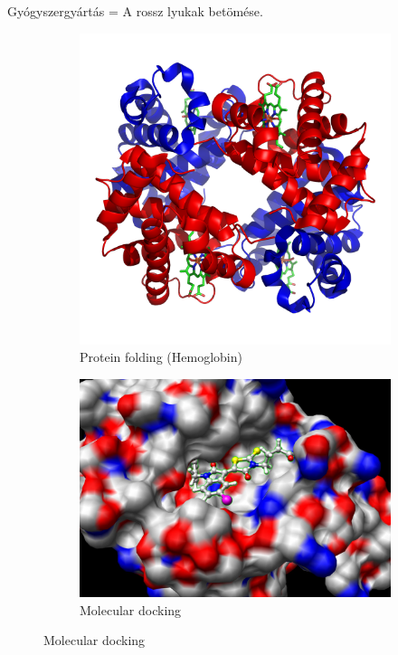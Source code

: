 \documentclass[aspectratio=169]{beamer}
\begin{document}
\begin{frame}{Gyógyszergyártás = A rossz lyukak betömése.}


\begin{figure}[H]
  \centering
  \begin{subfigure}{.4\linewidth}
    \centering
    \includegraphics[width=\linewidth]{./dipterv1_figures/hemoglobin.png}
    \caption{Protein folding (Hemoglobin)}
  \end{subfigure}
  \begin{subfigure}{.48\linewidth}
    \centering
    \includegraphics[width=\linewidth]{./dipterv1_figures/molecular_docking.jpg}
    \caption{Molecular docking}
  \end{subfigure}
\end{figure}

\end{frame}
\end{document}
